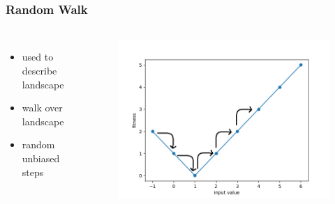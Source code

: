 \begin{frame}
	\frametitle{Random Walk}
	\framesubtitle{\cite{Kauffman.1987}}
	
	\begin{columns}[c]
		

		\begin{itemize}
			\item used to describe landscape
			\item walk over landscape
			\item random unbiased steps
		\end{itemize}
		
		\begin{figure}
			\includegraphics[width=1\textwidth]{figures/random_walk}
		\end{figure}

	\end{columns}
	
\end{frame}

